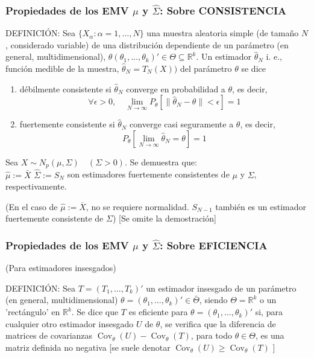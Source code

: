 \documentclass[11pt,a4paper]{article}
\begin{document}
\subsubsection{Propiedades de los EMV \texorpdfstring{$\hat{\mu}$}) y \texorpdfstring{$\hat{\Sigma}$}): Sobre CONSISTENCIA}
DEFINICIÓN: Sea $\{X_{\alpha}: \alpha=1, \ldots, N\}$ una muestra aleatoria simple (de tamaño $N$, considerado variable) de una distribución dependiente de un parámetro (en general, multidimensional), $\theta(\theta_{1}, \ldots, \theta_{k})' \in \Theta \subseteq \mathbb{R}^{k}$. Un estimador $\hat{\theta}_{N}$ i. e., función medible de la muestra, $\hat{\theta}_{N}=T_{N}(X))$ del parámetro $\theta$ se dice
\begin{enumerate}[label=(\alph*)]
\item débilmente consistente si $\hat{\theta}_{N}$ converge en probabilidad a $\theta$, es decir,
$$\forall \epsilon>0, \quad \lim\limits_{N \to \infty} P_{\theta} [\|\hat{\theta}_{N}-\theta\|<\epsilon]=1$$

\item fuertemente consistente si $\hat{\theta}_{N}$ converge casi seguramente a $\theta$, es decir,
$$P_{\theta} [\lim\limits_{N \to \infty} \hat{\theta}_{N}=\theta]=1$$
\end{enumerate}

Sea $X \sim N_{p}(\mu, \Sigma) \quad(\Sigma>0)$. Se demuestra que: \\
$\hat{\mu}:=\bar{X}$ $\hat{\Sigma}:=S_{N}$ son estimadores fuertemente consistentes de $\mu$ y $\Sigma$, respectivamente.

(En el caso de $\hat{\mu}:=\overline{X}$, no se requiere normalidad. $S_{N-1}$ también es un estimador fuertemente consistente de $\Sigma$) [Se omite la demostración]

\subsubsection{Propiedades de los EMV \texorpdfstring{$\hat{\mu}$}) y \texorpdfstring{$\hat{\Sigma}$}): Sobre EFICIENCIA}
(Para estimadores insesgados)

DEFINICIÓN: Sea $T=(T_{1}, \ldots, T_{k})'$ un estimador insesgado de un parámetro (en general, multidimensional) $\theta=(\theta_{1}, \ldots, \theta_{k})' \in \bar{\Theta}$, siendo $\Theta=\mathbb{R}^{k}$ o un 'rectángulo' en $\mathbb{R}^{k}$. Se dice que $T$ es eficiente para $\theta=(\theta_{1}, \ldots, \theta_{k})'$ si, para cualquier otro estimador insesgado $U$ de $\theta$, se verifica que la diferencia de matrices de covarianzas $\operatorname{Cov}_{\theta}(U)-\operatorname{Cov}_{\theta}(T)$, para todo $\theta \in \Theta$, es una matriz definida no negativa [se suele denotar $\operatorname{Cov}_{\theta}(U) \geq \operatorname{Cov}_{\theta}(T)$ ]
\end{document}
